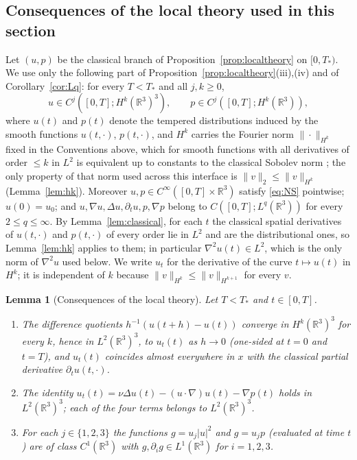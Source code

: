 \documentclass[11pt]{article}
\newtheorem{lemma}[theorem]{Lemma}
\theoremstyle{definition}
\theoremstyle{plain}
\newcommand{\R}{\mathbb R}
\begin{document}
\subsection*{Consequences of the local theory used in this section}

Let $(u,p)$ be the classical branch of Proposition~\ref{prop:localtheory}
on $[0,T_*)$.  We use only the following part of
Proposition~\ref{prop:localtheory}(iii),(iv) and of
Corollary~\ref{cor:Lq}: for every $T<T_*$ and all $j,k\ge0$,
\[
 u\in C^j([0,T];H^k(\R^3)^3),\qquad p\in C^j([0,T];H^k(\R^3)),
\]
where $u(t)$ and $p(t)$ denote the tempered distributions induced by the
smooth functions $u(t,\cdot)$, $p(t,\cdot)$, and $H^k$ carries the Fourier
norm $\|\cdot\|_{H^k}$ fixed in the Conventions above, which for smooth
functions with all derivatives of order $\le k$ in $L^2$ is equivalent up to
constants to the classical Sobolev norm \cite[p.~36]{Tao2013}; the only
property of that norm used across this interface is
$\|v\|_2\le\|v\|_{H^k}$ (Lemma~\ref{lem:hk}).  Moreover
$u,p\in C^\infty([0,T]\times\R^3)$ satisfy \eqref{eq:NS} pointwise;
$u(0)=u_0$; and $u,\nabla u,\Delta u,\partial_tu,p,\nabla p$ belong to
$C([0,T];L^q(\R^3))$ for every $2\le q\le\infty$.  By
Lemma~\ref{lem:classical}, for each $t$ the classical spatial derivatives
of $u(t,\cdot)$ and $p(t,\cdot)$ of every order lie in $L^2$ and are the
distributional ones, so Lemma~\ref{lem:hk} applies to them; in particular
$\nabla^2u(t)\in L^2$, which is the only norm of $\nabla^2u$ used below.
We write $u_t$ for the derivative of the curve $t\mapsto u(t)$ in $H^k$; it is independent
of $k$ because $\|v\|_{H^k}\le\|v\|_{H^{k+1}}$ for every $v$.

\begin{lemma}[Consequences of the local theory]\label{lem:R-consequences}
Let $T<T_*$ and $t\in[0,T]$.
\begin{enumerate}
\item[(a)] The difference quotients $h^{-1}(u(t+h)-u(t))$ converge in
$H^k(\R^3)^3$ for every $k$, hence in $L^2(\R^3)^3$, to $u_t(t)$ as $h\to0$
(one-sided at $t=0$ and $t=T$), and $u_t(t)$ coincides almost everywhere in
$x$ with the classical partial derivative $\partial_tu(t,\cdot)$.
\item[(b)] The identity
$u_t(t)=\nu\Delta u(t)-(u\cdot\nabla)u(t)-\nabla p(t)$ holds in
$L^2(\R^3)^3$; each of the four terms belongs to $L^2(\R^3)^3$.
\item[(c)] For each $j\in\{1,2,3\}$ the functions $g=u_j|u|^2$ and
$g=u_jp$ (evaluated at time $t$) are of class $C^1(\R^3)$ with
$g,\partial_ig\in L^1(\R^3)$ for $i=1,2,3$.
\end{enumerate}
\end{lemma}
\end{document}
